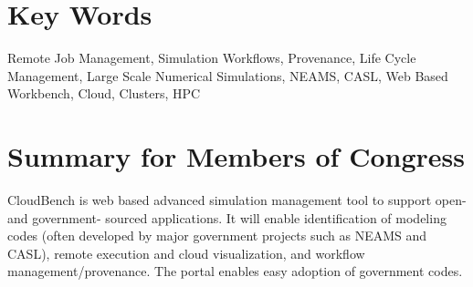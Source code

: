 \section*{Key Words}
Remote Job Management, Simulation Workflows, Provenance, Life Cycle
Management, Large Scale Numerical Simulations, NEAMS, CASL, Web Based
Workbench, Cloud, Clusters, HPC 



\section*{Summary for Members of Congress}
CloudBench is web based advanced simulation management tool to support
open- and government- sourced applications. It will enable
identification of modeling codes (often developed by major government
projects such as NEAMS and CASL), remote execution and cloud
visualization, and workflow management/provenance. The portal enables
easy adoption of government codes.
